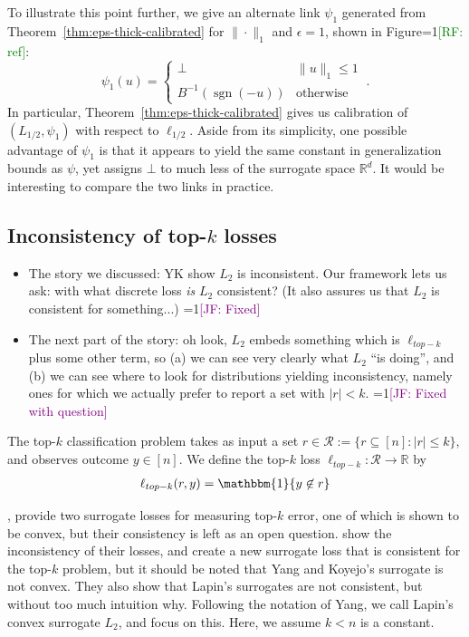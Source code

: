 \documentclass[12pt]{article}
\newcommand{\Comments}{1}
\newcommand{\mynote}[2]{\ifnum\Comments=1\textcolor{#1}{#2}\fi}
\newcommand{\raf}[1]{\mynote{green}{[RF: #1]}}
\newcommand{\jessie}[1]{\mynote{purple}{[JF: #1]}}
\newcommand{\reals}{\mathbb{R}}
\newcommand{\R}{\mathcal{R}}
\newcommand{\ones}{\mathbbm{1}}
\newcommand{\Ind}[1]{\ones\{#1\}}
\newcommand{\ellabs}[1]{\ell_{#1}}
\DeclareMathOperator*{\sgn}{sgn}
\begin{document}
To illustrate this point further, we give an alternate link $\psi_1$ generated from Theorem~\ref{thm:eps-thick-calibrated} for $\|\cdot\|_1$ and $\epsilon=1$, shown in Figure\raf{ref}:
\begin{equation}\label{eq:abstain-link}
  \psi_1(u) = \begin{cases}
	\bot & \|u\|_1 \leq 1\\
	B^{-1}(\sgn(-u)) &\text{otherwise}
  \end{cases}~.
\end{equation}
In particular, Theorem~\ref{thm:eps-thick-calibrated} gives us calibration of $(L_{1/2},\psi_1)$ with respect to $\ellabs{1/2}$.
Aside from its simplicity, one possible advantage of $\psi_1$ is that it appears to yield the same constant in generalization bounds as $\psi$, yet assigns $\bot$ to much less of the surrogate space $\reals^d$.
It would be interesting to compare the two links in practice.

\subsection{Inconsistency of top-$k$ losses}

  \begin{itemize}
  \item The story we discussed: YK show $L_2$ is inconsistent.  Our framework lets us ask: with what discrete loss \emph{is} $L_2$ consistent?  (It also assures us that $L_2$ is consistent for something...) \jessie{Fixed}
  \item The next part of the story: oh look, $L_2$ embeds something which is $\ell_{top-k}$ plus some other term, so (a) we can see very clearly what $L_2$ ``is doing'', and (b) we can see where to look for distributions yielding inconsistency, namely ones for which we actually prefer to report a set with $|r|<k$. \jessie{Fixed with question}
  \end{itemize}
  
  The top-$k$ classification problem takes as input a set $r \in \R := \{r \subseteq [n] : |r| \leq k\}$, and observes outcome $y \in [n]$.
  We define the top-$k$ loss $\ell_{top-k}:\R \to \reals$ by
\begin{align}\label{eq:top-k}
\ell_{top-k}(r,y) = \Ind{y \not \in r}
\end{align}

  \citet{lapin2015top, lapin2016loss, lapin2018analysis}, provide two surrogate losses for measuring top-$k$ error, one of which is shown to be convex, but their consistency is left as an open question.
  \citet{yang2018consistency} show the inconsistency of their losses, and create a new surrogate loss that is consistent for the top-$k$ problem, but it should be noted that Yang and Koyejo's surrogate is not convex.
  They also show that Lapin's surrogates are not consistent, but without too much intuition why.
  Following the notation of Yang, we call Lapin's~\cite{lapin2016loss} convex surrogate $L_2$, and focus on this.
  Here, we assume $k < n$ is a constant.
\end{document}
